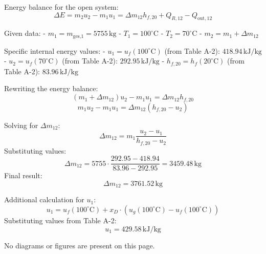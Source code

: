 Energy balance for the open system:  
\[
\Delta E = m_2 u_2 - m_1 u_1 = \Delta m_{12} h_{f,20} + Q_{R,12} - Q_{\text{out},12}
\]  

Given data:  
- \( m_1 = m_{\text{ges,1}} = 5755 \, \text{kg} \)  
- \( T_1 = 100^\circ\text{C} \)  
- \( T_2 = 70^\circ\text{C} \)  
- \( m_2 = m_1 + \Delta m_{12} \)  

Specific internal energy values:  
- \( u_1 = u_f(100^\circ\text{C}) \) (from Table A-2): \( 418.94 \, \text{kJ/kg} \)  
- \( u_2 = u_f(70^\circ\text{C}) \) (from Table A-2): \( 292.95 \, \text{kJ/kg} \)  
- \( h_{f,20} = h_f(20^\circ\text{C}) \) (from Table A-2): \( 83.96 \, \text{kJ/kg} \)  

Rewriting the energy balance:  
\[
(m_1 + \Delta m_{12}) u_2 - m_1 u_1 = \Delta m_{12} h_{f,20}
\]  
\[
m_1 u_2 - m_1 u_1 = \Delta m_{12} (h_{f,20} - u_2)
\]  

Solving for \( \Delta m_{12} \):  
\[
\Delta m_{12} = m_1 \frac{u_2 - u_1}{h_{f,20} - u_2}
\]  
Substituting values:  
\[
\Delta m_{12} = 5755 \cdot \frac{292.95 - 418.94}{83.96 - 292.95} = 3459.48 \, \text{kg}
\]  
Final result:  
\[
\Delta m_{12} = 3761.52 \, \text{kg}
\]  

Additional calculation for \( u_1 \):  
\[
u_1 = u_f(100^\circ\text{C}) + x_D \cdot \left( u_g(100^\circ\text{C}) - u_f(100^\circ\text{C}) \right)
\]  
Substituting values from Table A-2:  
\[
u_1 = 429.58 \, \text{kJ/kg}
\]  

No diagrams or figures are present on this page.